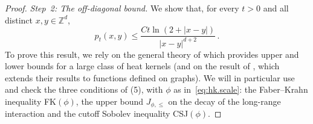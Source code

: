 \documentclass[11pt]{amsart}
\numberwithin{equation}{section}
\newcommand{\Z}{\mathbb{Z}}
\begin{document}
\begin{proof}
\emph{Step~2: The off-diagonal bound.}
We show that, for every $t > 0$ and all distinct $x, y \in \Z^d$,
\begin{equation} \label{eq:offdiagonal}
   p_t(x, y) \leq \frac{C t \ln(2 + |x - y|)}{|x - y|^{d+2}}\,.
\end{equation}
To prove this result, we rely on the general theory of \citet*{CKW2021Stability} which provides upper and lower bounds for a large class of heat kernels (and on the result of \citet{Malmquist2023}, which extends their results to functions defined on graphs). We will in particular use \citet*[Theorem~1.15, (5) implies (1)]{CKW2021Stability} and check the three conditions of (5), with $\phi$ as in~\eqref{eq:hk.scale}: the Faber--Krahn inequality FK$(\phi)$, the upper bound $J_{\phi, \leq}$ on the decay of the long-range interaction and the cutoff Sobolev inequality CSJ$(\phi)$.


\end{proof}
\end{document}
